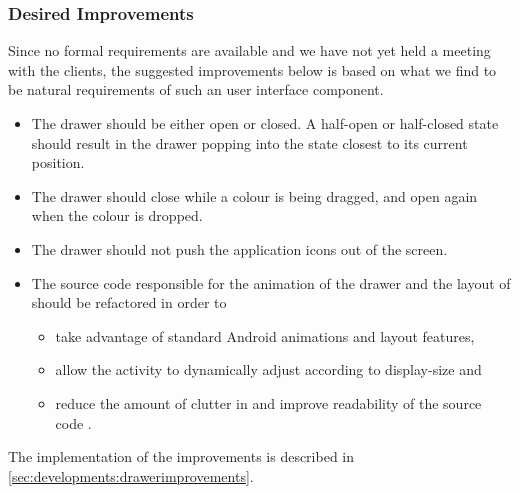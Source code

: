 \subsubsection{Desired Improvements}
Since no formal requirements are available and we have not yet held a meeting with the clients, the suggested improvements below is based on what we find to be natural requirements of such an user interface component. 

\begin{itemize}
\item The drawer should be either open or closed. 
A half-open or half-closed state should result in the drawer popping into the state closest to its current position.
\item The drawer should close while a colour is being dragged, and open again when the colour is dropped.
\item The drawer should not push the application icons out of the screen.
\item The source code responsible for the animation of the drawer and the layout of \homeactivity should be refactored in order to
	\begin{itemize}
	\item take advantage of standard Android animations and layout features,
	\item allow the activity to dynamically adjust according to display-size and
	\item reduce the amount of clutter in and improve readability of the source code .
	\end{itemize}
\end{itemize}

The implementation of the improvements is described in \cref{sec:developments:drawerimprovements}.